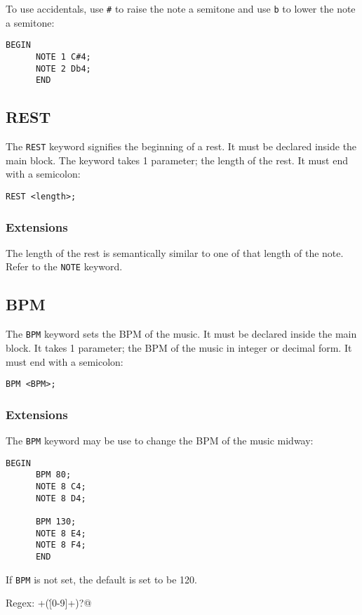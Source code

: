 \documentclass{article}
\begin{document}
To use accidentals, use \verb+#+ to raise the note a semitone and use \verb+b+ to lower the
note a semitone:
\begin{Verbatim}[frame=single]
      BEGIN
      NOTE 1 C#4;
      NOTE 2 Db4;
      END
\end{Verbatim}

\subsection{REST}
The \verb+REST+ keyword signifies the beginning of a rest. It must be declared inside
the main block.
The keyword takes 1 parameter; the length of the rest. It must end with a semicolon:
\begin{Verbatim}[frame=single]
      REST <length>;
\end{Verbatim}

\subsubsection{Extensions}

The length of the rest is semantically similar to one of that length
of the note. Refer to the \verb+NOTE+ keyword.

\subsection{BPM}

The \verb+BPM+ keyword sets the BPM of the music. It must be declared inside the main block.
It takes 1 parameter; the BPM of the music in integer or decimal form. It must end
with a semicolon:
\begin{Verbatim}[frame=single]
      BPM <BPM>;
\end{Verbatim}

\subsubsection{Extensions}

The \verb+BPM+ keyword may be use to change the BPM of the music midway:
\begin{Verbatim}[frame=single]
      BEGIN
      BPM 80;
      NOTE 8 C4;
      NOTE 8 D4;

      BPM 130;
      NOTE 8 E4;
      NOTE 8 F4;
      END
\end{Verbatim}

If \verb+BPM+ is not set, the default is set to be 120.

Regex: \verb@[0-9]+(\.[0-9]+)?@
\end{document}
